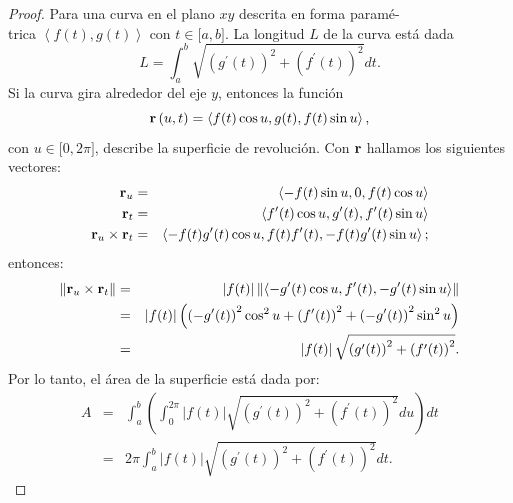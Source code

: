 \begin{proof}
  Para una curva en el plano $xy$ descrita en forma paramé- \\ trica
$\left\langle f(t) ,g(t) \right\rangle$ con $t\in\lbrack a,b]$. La longitud $L$ de la curva está dada
\[L=\int_{a}^{b}\sqrt{\left( g^{\prime }(t)\right) ^{2}+\left( f^{\prime }(t) \right) ^{2}}dt.\]
Si la curva gira alrededor del eje $y$, entonces la función
\[{\bf r}\left(u,t\right) =\left\langle f(t) \cos u,g(t) ,f(t) \sin u\right\rangle,\]
con $u\in \lbrack 0,2\pi ]$,
describe la superficie de revolución.
Con ${\bf r}$ hallamos los siguientes vectores:
\begin{eqnarray*}
{\bf r}_{u} &=& \left\langle -f(t) \sin u,0,f(t) \cos u\right\rangle \\
{\bf r}_{t}&=&\left\langle f^{\prime }(t) \cos u,g^{\prime }(t) ,f^{\prime }(t) \sin u\right\rangle \\
{\bf r}_{u}\times {\bf r}_{t}&=& \left\langle-f(t)g^{\prime}(t)\cos u,f(t)f^{\prime}(t),-f(t)g^{\prime}(t)\sin u\right\rangle;
\end{eqnarray*}
entonces:
\begin{eqnarray*}
\left\Vert {\bf r}_{u}\times {\bf r}_{t}\right\Vert &=& \left\vert f(t) \right\vert \left\Vert\left\langle -g^{\prime }(t) \cos u,f^{\prime }(t),-g^{\prime }(t) \sin u\right\rangle \right\Vert\\
&=& \left\vert f(t) \right\vert \left( \left( -g^{\prime }(t)\right) ^{2}\cos ^{2}u+\left( f^{\prime }(t) \right) ^{2}+\left(-g^{\prime }(t) \right) ^{2}\sin ^{2}u\right) \\
&=& \left\vert f(t) \right\vert \sqrt{\left( g^{\prime }(t) \right) ^{2}+\left( f^{\prime }(t) \right) ^{2}}.
\end{eqnarray*}
Por lo tanto, el área de la superficie está dada por:
%
\begin{eqnarray*}
A &=& \int_{a}^{b}\left( \int_{0}^{2\pi }\left\vert f(t)\right\vert \sqrt{\left( g^{\prime }(t) \right) ^{2}+\left(f^{\prime }(t) \right) ^{2}}du\right) dt \\
&=& 2\pi\int_{a}^{b}\left\vert f(t) \right\vert \sqrt{\left( g^{\prime}(t) \right) ^{2}+\left( f^{\prime }(t) \right) ^{2}}dt.
\end{eqnarray*}


\end{proof}

